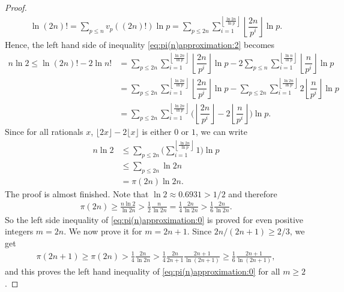 \begin{proof}
\begin{align*}
				\ln (2n)! = \sum_{p \leq n} v_p\left((2n)!\right) \ln p = \sum_{p \leq 2n}  \sum_{i=1}^{\left\lfloor \frac{\ln 2n}{\ln p}\right\rfloor}\left\lfloor\dfrac{2n}{p^i}\right\rfloor \ln p.
			\end{align*}
		Hence, the left hand side of inequality \eqref{eq:pi(n)approximation:2} becomes
			\begin{align}
			n \ln 2 \leq \ln (2n)! - 2 \ln n! &= \sum_{p \leq 2n}  \sum_{i=1}^{\left\lfloor \frac{\ln 2n}{\ln p}\right\rfloor}\left\lfloor\dfrac{2n}{p^i}\right\rfloor \ln p - 2  \sum_{p \leq n} \sum_{i=1}^{\left\lfloor \frac{\ln n}{\ln p}\right\rfloor} \left\lfloor\dfrac{n}{p^i}\right\rfloor \ln p \nonumber\\
											  &= \sum_{p \leq 2n}  \sum_{i=1}^{\left\lfloor \frac{\ln 2n}{\ln p}\right\rfloor}\left\lfloor\dfrac{2n}{p^i}\right\rfloor \ln p -  \sum_{p \leq 2n} \sum_{i=1}^{\left\lfloor \frac{\ln 2n}{\ln p}\right\rfloor} 2 \left\lfloor\dfrac{n}{p^i}\right\rfloor \ln p \nonumber\\
										   	  &= \sum_{p \leq 2n}  \sum_{i=1}^{\left\lfloor \frac{\ln 2n}{\ln p}\right\rfloor} \Bigg(\left\lfloor\dfrac{2n}{p^i}\right\rfloor - 2 \left\lfloor\dfrac{n}{p^i}\right\rfloor\Bigg) \ln p. 		\label{eq:pi(n)approximation:4}
			\end{align}
		Since for all rationals $x$, $\lfloor2x\rfloor-2\lfloor x\rfloor$ is either $0$ or $1$, we can write
			\begin{align*}
			n \ln 2 &\leq \sum_{p \leq 2n}  \Bigg(\sum_{i=1}^{\left\lfloor \frac{\ln 2n}{\ln p}\right\rfloor} 1\Bigg) \ln p\\
					&\leq \sum_{p \leq 2n} \ln 2n\\
					&=\pi(2n)\ln 2n.			
			\end{align*}
		The proof is almost finished. Note that $\ln 2 \approx 0.6931 > 1/2$ and therefore
			\begin{align*}
				\pi(2n) \geq \frac{n \ln 2}{\ln 2n} > \frac{1}{2}\frac{n}{\ln 2n} = \frac{1}{4}\frac{2n}{\ln 2n} > \frac{1}{6}\frac{2n}{\ln 2n}.
			\end{align*}
		So the left side inequality of \eqref{eq:pi(n)approximation:0} is proved for even positive integers $m=2n$. We now prove it for $m=2n+1$. Since $2n/(2n+1)\geq 2/3$, we get
			\begin{align*}
				\pi(2n+1) \geq \pi(2n) > \frac{1}{4}\frac{2n}{\ln 2n} > \frac{1}{4} \frac{2n}{2n+1}\frac{2n+1}{\ln (2n+1)} \geq \frac{1}{6}\frac{2n+1}{\ln (2n+1)},
			\end{align*}
		and this proves the left hand inequality of \eqref{eq:pi(n)approximation:0} for all $m \geq 2$.
		

\end{proof}
